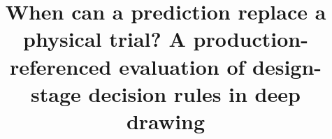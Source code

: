 \documentclass[pdflatex,sn-basic,lineno]{sn-jnl}
\newif\ifanon
\providecommand{\DIFdelbegin}{} %
\newcommand{\DIFscaledelfig}{0.5}
\newlength{\DIFdelgraphicswidth} %
\newlength{\DIFdelgraphicsheight} %
\newcommand{\DIFdelincludegraphics}[2][]{%
\sbox{\DIFdelgraphicsbox}{\DIFOincludegraphics[#1]{#2}}%
\settoboxwidth{\DIFdelgraphicswidth}{\DIFdelgraphicsbox} %
\settoboxtotalheight{\DIFdelgraphicsheight}{\DIFdelgraphicsbox} %
\scalebox{\DIFscaledelfig}{%
\parbox[b]{\DIFdelgraphicswidth}{\usebox{\DIFdelgraphicsbox}\\[-\baselineskip] \rule{\DIFdelgraphicswidth}{0em}}\llap{\resizebox{\DIFdelgraphicswidth}{\DIFdelgraphicsheight}{%
\setlength{\unitlength}{\DIFdelgraphicswidth}%
\begin{picture}(1,1)%
\thicklines\linethickness{2pt} %
{\color[rgb]{1,0,0}\put(0,0){\framebox(1,1){}}}%
{\color[rgb]{1,0,0}\put(0,0){\line( 1,1){1}}}%
{\color[rgb]{1,0,0}\put(0,1){\line(1,-1){1}}}%
\end{picture}%
}\hspace*{3pt}}} %
} %
\DeclareRobustCommand{\DIFdelbegin}{\DIFOdelbegin \let\includegraphics\DIFdelincludegraphics} %
\begin{document}
\title[When can a prediction replace a trial?]{When can a prediction replace a physical trial? A production-referenced evaluation of design-stage decision rules in deep drawing}

\ifanon
\author*[1]{\fnm{Anonymised} \sur{for review}}
\affil*[1]{\orgname{Affiliation withheld for review}}
\else
\author*[1]{ }

\fi

\DIFdelbegin %
\end{document}
